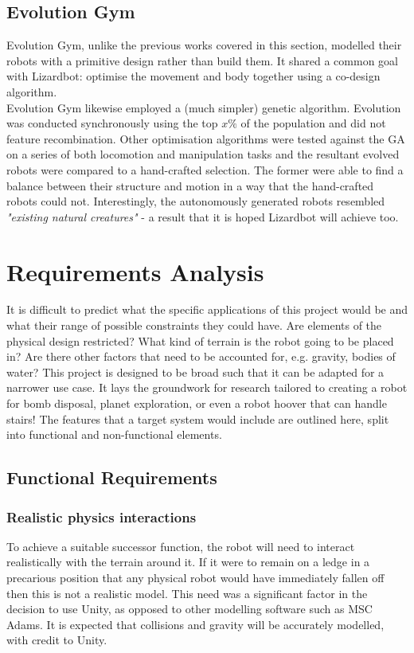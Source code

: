 \documentclass{article}
\begin{document}
\subsection{Evolution Gym}
Evolution Gym,  unlike the previous works covered in this section, modelled their robots with a primitive design rather than build them. It shared a common goal with Lizardbot: optimise the movement and body together using a co-design algorithm. \\
Evolution Gym likewise employed a (much simpler) genetic algorithm. Evolution was conducted synchronously using the top $x\%$ of the population and did not feature recombination. Other optimisation algorithms were tested against the GA on a series of both locomotion and manipulation tasks and the resultant evolved robots were compared to a hand-crafted selection. The former were able to find a balance between their structure and motion in a way that the hand-crafted robots could not. Interestingly, the autonomously generated robots resembled \textit{"existing natural creatures"} - a result that it is hoped Lizardbot will achieve too.

\newpage
\section{Requirements Analysis}
It is difficult to predict what the specific applications of this project would be and what their range of possible constraints they could have. Are elements of the physical design restricted? What kind of terrain is the robot going to be placed in? Are there other factors that need to be accounted for, e.g. gravity, bodies of water? This project is designed to be broad such that it can be adapted for a narrower use case. It lays the groundwork for research tailored to creating a robot for bomb disposal, planet exploration, or even a robot hoover that can handle stairs!
The features that a target system would include are outlined here, split into functional and non-functional elements.

\subsection{Functional Requirements}
\subsubsection{Realistic physics interactions}
To achieve a suitable successor function, the robot will need to interact realistically with the terrain around it. If it were to remain on a ledge in a precarious position that any physical robot would have immediately fallen off then this is not a realistic model. 
This need was a significant factor in the decision to use Unity, as opposed to other modelling software such as MSC Adams.  It is expected that collisions and gravity will be accurately modelled, with credit to Unity.
\end{document}
